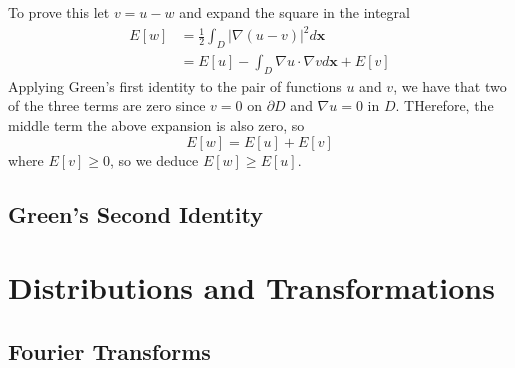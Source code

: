 \documentclass[12pt, a4paper, oneside, openright, titlepage]{book}
\begin{document}
To prove this let $v = u-w$ and expand the square in the integral \begin{align*}
    E[w] &= \frac{1}{2}\int_D|\nabla(u-v)|^2d\mathbf{x} \\
    &= E[u] - \int_D\nabla u \cdot \nabla vd\mathbf{x} + E[v]
\end{align*}
Applying Green's first identity to the pair of functions $u$ and $v$, we have that two of the three terms are zero since $v = 0$ on $\partial D$ and $\nabla u = 0$ in $D$. THerefore, the middle term the above expansion is also zero, so \begin{equation*}
    E[w] = E[u] + E[v]
\end{equation*}
where $E[v] \geq 0$, so we deduce $E[w] \geq E[u]$.



\section{Green's Second Identity}







\chapter{Distributions and Transformations}

\section{Fourier Transforms}
\end{document}
